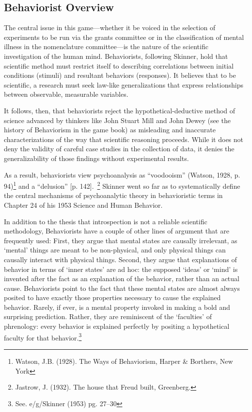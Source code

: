 \begin{refsection}
\pagebreak 

\chapter{Behaviorist Overview}
\label{behavioristoverview}

The central issue in this game—whether it be voiced in the selection of experiments to be run via the grants committee or in the classification of mental illness in the nomenclature committee—is the nature of the scientific investigation of the human mind. Behaviorists, following Skinner, hold that scientific method must restrict itself to describing correlations between initial conditions (stimuli) and resultant behaviors (responses). It believes that to be scientific, a research must seek law-like generalizations that express relationships between observable, measurable variables.

It follows, then, that behaviorists reject the hypothetical-deductive method of science advanced by thinkers like John Stuart Mill and John Dewey (see the history of Behaviorism in the game book) as misleading and inaccurate characterizations of the way that scientific reasoning proceeds. While it does not deny the validity of careful case studies in the collection of data, it denies the generalizability of those findings without experimental results.

As a result, behaviorists view psychoanalysis as “voodooism” (Watson, 1928, p. 94)\footnote{Watson, J.B. (1928). The Ways of Behaviorism, Harper \& Borthers, New York} and a “delusion” [p. 142].~\citep{Jastrow:1932wl}\footnote{Jastrow, J. (1932). The house that Freud built, Greenberg.} Skinner went so far as to systematically define the central mechanisms of psychoanalytic theory in behavioristic terms in Chapter 24 of his 1953 Science and Human Behavior.

In addition to the thesis that introspection is not a reliable scientific methodology, Behaviorists have a couple of other lines of argument that are frequently used: First, they argue that mental states are causally irrelevant, as `mental' things are meant to be non-physical, and only physical things can causally interact with physical things. Second, they argue that explanations of behavior in terms of `inner states' are ad hoc: the supposed `ideas' or `mind' is invented after the fact as an explanation of the behavior, rather than an actual cause. Behaviorists point to the fact that these mental states are almost always posited to have exactly those properties necessary to cause the explained behavior. Rarely, if ever, is a mental property invoked in making a bold and surprising prediction. Rather, they are reminiscent of the `faculties' of phrenology: every behavior is explained perfectly by positing a hypothetical faculty for that behavior.\footnote{See. e\slash g\slash  Skinner (1953) pg. 27--30} 


\end{refsection}
